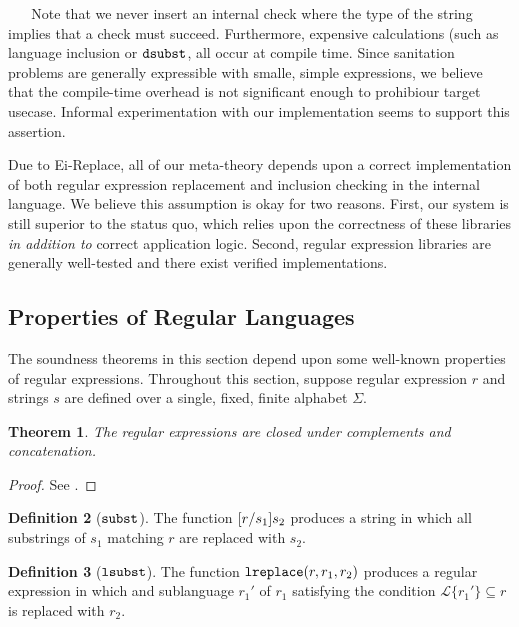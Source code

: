 \documentclass{acm_proc_article-sp}
\newtheorem{thm}{Theorem}
\theoremstyle{definition}
\newtheorem{defn}[thm]{Definition}
\newcommand{\Lagr}{\mathcal{L}}
\newcommand{\lang}[1]{\Lagr\{#1\}}
\newcommand{\lsubst}[3]{{\tt lreplace}(#1,#2,#3)}
\begin{document}
\newpage
\ 
\newpage
\ 
\newpage
Note that we never insert an internal check where the type of the string implies
that a check must succeed. Furthermore, expensive calculations (such as language
inclusion or ${\tt dsubst}$, all occur at compile time.
Since sanitation problems are generally expressible with smalle, simple expressions,
we believe that the compile-time overhead is not significant enough to prohibiour target usecase. Informal experimentation with our implementation seems to
support this assertion.

Due to Ei-Replace, all of our meta-theory depends upon a correct implementation
of both regular expression replacement and inclusion checking in the internal language.
We believe this assumption is okay for two reasons. First, our system is still
superior to the status quo, which relies upon the correctness of these libraries
\emph{in addition to} correct application logic. Second, regular expression libraries are
generally well-tested and there exist verified implementations.


\subsection{Properties of Regular Languages}

The soundness theorems in this section depend upon some well-known properties
of regular expressions. Throughout this section, suppose regular expression
$r$ and strings $s$ are defined over a single, fixed, finite alphabet $\Sigma$.

\begin{thm} \label{thm:closure}
The regular expressions are closed under complements and concatenation.
\end{thm}
\begin{proof}
See \cite{cinderella}.
\end{proof}


\begin{defn}[$\tt{subst}$]
  The function $[r/s_1]s_2$ produces a string in which all substrings
  of $s_1$ matching $r$ are replaced with $s_2$.
\end{defn}

\begin{defn}[$\tt{lsubst}$]
  The function $\lsubst{r}{r_1}{r_2}$ produces a regular expression in which
  and sublanguage $r_1'$ of $r_1$ satisfying the condition $\lang{r_1'} \subseteq{r}$
  is replaced with $r_2$.
\end{defn}
\end{document}
